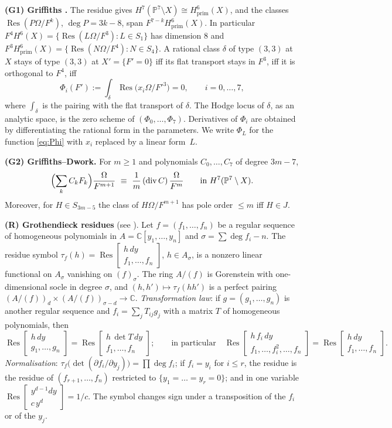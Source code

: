 \documentclass[10pt]{article}
\numberwithin{equation}{section}
\theoremstyle{remark}
\newcommand{\PP}{\mathbb{P}}
\newcommand{\CC}{\mathbb{C}}
\newcommand{\Res}{\operatorname{Res}}
\newcommand{\dv}{\operatorname{div}}
\newcommand{\gres}[2]{\Res\!\begin{bmatrix} #1 \\ #2 \end{bmatrix}}
\newcommand{\run}[1]{\medskip\noindent\textbf{#1}}
\begin{document}
\run{(G1) Griffiths \cite{Gr}.} The residue gives $H^7(\PP^7\setminus X)\cong H^6_{\mathrm{prim}}(X)$, and the
classes $\Res(P\Omega/F^k)$, $\deg P=3k-8$, span $F^{7-k}H^6_{\mathrm{prim}}(X)$. In particular
$F^4H^6(X)=\{\Res(L\Omega/F^3):L\in S_1\}$ has dimension $8$ and
$F^3H^6_{\mathrm{prim}}(X)=\{\Res(N\Omega/F^4):N\in S_4\}$.
A rational class $\delta$ of type $(3,3)$ at $X$ stays of type $(3,3)$ at $X'=\{F'=0\}$ iff its flat transport
stays in $F^3$, iff it is orthogonal to $F^4$, iff
\begin{equation}\label{eq:Phi}
\Phi_i(F'):=\int_\delta\Res\bigl(x_i\Omega/F'^3\bigr)=0,\qquad i=0,\dots,7,
\end{equation}
where $\int_\delta$ is the pairing with the flat transport of $\delta$. The Hodge locus of $\delta$, as an
analytic space, is the zero scheme of $(\Phi_0,\dots,\Phi_7)$. Derivatives of $\Phi_i$ are obtained by
differentiating the rational form in the parameters. We write $\Phi_L$ for the function \eqref{eq:Phi} with
$x_i$ replaced by a linear form~$L$.

\run{(G2) Griffiths--Dwork.} For $m\ge1$ and polynomials $C_0,\dots,C_7$ of degree $3m-7$,
\begin{equation}\label{eq:GD}
\Bigl(\sum_kC_kF_k\Bigr)\frac{\Omega}{F^{m+1}}\ \equiv\ \frac1m\,(\dv C)\,\frac{\Omega}{F^{m}}
\qquad\text{in }H^7(\PP^7\setminus X).
\end{equation}
Moreover, for $H\in S_{3m-5}$ the class of $H\Omega/F^{m+1}$ has pole order $\le m$ iff $H\in J$.

\run{(R) Grothendieck residues} (see \cite{CCD}). Let $f=(f_1,\dots,f_n)$ be a regular sequence of homogeneous
polynomials in $A=\CC[y_1,\dots,y_n]$ and $\sigma=\sum\deg f_i-n$. The residue symbol
$\tau_f(h)=\gres{h\,dy}{f_1,\dots,f_n}$, $h\in A_\sigma$, is a nonzero linear functional on $A_\sigma$ vanishing
on $(f)_\sigma$. The ring $A/(f)$ is Gorenstein with one-dimensional socle in degree $\sigma$, and
$(h,h')\mapsto\tau_f(hh')$ is a perfect pairing $(A/(f))_d\times(A/(f))_{\sigma-d}\to\CC$.
\emph{Transformation law}: if $g=(g_1,\dots,g_n)$ is another regular sequence and $f_i=\sum_jT_{ij}g_j$ with a
matrix $T$ of homogeneous polynomials, then
\begin{equation}\label{eq:transf}
\gres{h\,dy}{g_1,\dots,g_n}=\gres{h\,\det T\,dy}{f_1,\dots,f_n};\qquad\text{in particular}\quad
\gres{h\,f_i\,dy}{f_1,\dots,f_i^2,\dots,f_n}=\gres{h\,dy}{f_1,\dots,f_n}.
\end{equation}
\emph{Normalisation}: $\tau_f\bigl(\det(\partial f_i/\partial y_j)\bigr)=\prod\deg f_i$; if $f_i=y_i$ for $i\le r$,
the residue is the residue of $(f_{r+1},\dots,f_n)$ restricted to $\{y_1=\dots=y_r=0\}$; and in one variable
$\gres{y^{d-1}dy}{c\,y^d}=1/c$. The symbol changes sign under a transposition of the $f_i$ or of the $y_j$.
\end{document}
